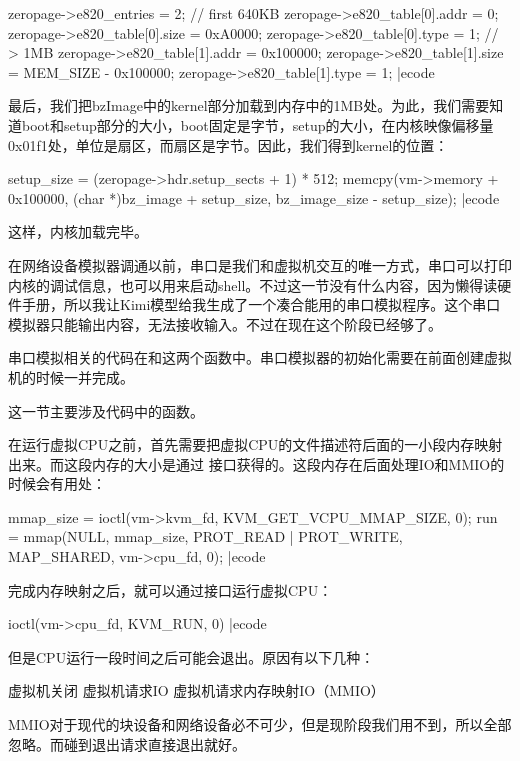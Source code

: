 \bcode
zeropage->e820_entries = 2;
// first 640KB
zeropage->e820_table[0].addr = 0;
zeropage->e820_table[0].size = 0xA0000;
zeropage->e820_table[0].type = 1;
// > 1MB
zeropage->e820_table[1].addr = 0x100000;
zeropage->e820_table[1].size = MEM_SIZE - 0x100000;
zeropage->e820_table[1].type = 1;
|ecode

最后，我们把\sp bzImage\sp 中的\sp kernel\sp 部分加载到内存中的\sp 1MB\sp 处。为此，我们需要知道boot和setup部分的大小，boot\sp 固定是\sp 字节，setup\sp 的大小，在内核映像偏移量\sp 0x01f1\sp 处，单位是扇区，而\sp 扇区是\sp 字节。因此，我们得到\sp kernel\sp 的位置：

\bcode
setup_size = (zeropage->hdr.setup_sects + 1) * 512;
memcpy(vm->memory + 0x100000,
       (char *)bz_image + setup_size,
       bz_image_size - setup_size);
|ecode

这样，内核加载完毕。


在网络设备模拟器调通以前，串口是我们和虚拟机交互的唯一方式，串口可以打印内核的调试信息，也可以用来启动\sp shell。不过这一节没有什么内容，因为懒得读硬件手册，所以我让\sp Kimi\sp 模型给我生成了一个凑合能用的串口模拟程序。这个串口模拟器只能输出内容，无法接收输入。不过在现在这个阶段已经够了。

串口模拟相关的代码在\sp 和\sp 这两个函数中。串口模拟器的初始化需要在前面创建虚拟机的时候一并完成。


这一节主要涉及代码中的\sp 函数。

在运行虚拟\sp CPU\sp 之前，首先需要把虚拟\sp CPU\sp 的文件描述符后面的一小段内存映射出来。而这段内存的大小是通过 接口获得的。这段内存在后面处理\sp IO\sp 和\sp MMIO\sp 的时候会有用处：

\bcode
mmap_size = ioctl(vm->kvm_fd, KVM_GET_VCPU_MMAP_SIZE, 0);
run = mmap(NULL, mmap_size, PROT_READ | PROT_WRITE,
           MAP_SHARED, vm->cpu_fd, 0);
|ecode

完成内存映射之后，就可以通过\sp 接口运行虚拟\sp CPU：

\bcode
ioctl(vm->cpu_fd, KVM_RUN, 0)
|ecode

但是\sp CPU\sp 运行一段时间之后可能会退出。原因有以下几种：

\bli
    \li 虚拟机关闭
    \li 虚拟机请求\sp IO
    \li 虚拟机请求内存映射\sp IO（MMIO）
\eli

MMIO\sp 对于现代的块设备和网络设备必不可少，但是现阶段我们用不到，所以全部忽略。而碰到退出请求直接退出就好。

